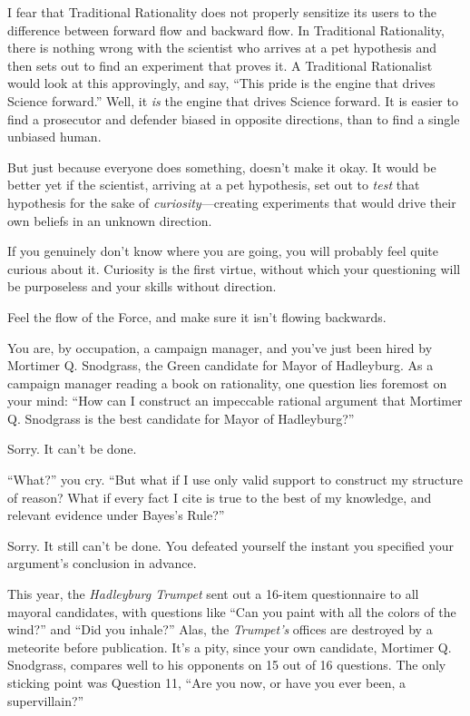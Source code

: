 {
 I fear that Traditional Rationality does not properly sensitize
its users to the difference between forward flow and backward flow. In
Traditional Rationality, there is nothing wrong with the scientist who
arrives at a pet hypothesis and then sets out to find an experiment
that proves it. A Traditional Rationalist would look at this
approvingly, and say, ``This pride is the engine that
drives Science forward.'' Well, it \textit{is} the
engine that drives Science forward. It is easier to find a prosecutor
and defender biased in opposite directions, than to find a single
unbiased human.}

{
 But just because everyone does something, doesn't
make it okay. It would be better yet if the scientist, arriving at a
pet hypothesis, set out to \textit{test} that hypothesis for the sake
of \textit{curiosity}{}---creating experiments that would drive their
own beliefs in an unknown direction.}

{
 If you genuinely don't know where you are going,
you will probably feel quite curious about it. Curiosity is the first
virtue, without which your questioning will be purposeless and your
skills without direction.}

{
 Feel the flow of the Force, and make sure it isn't
flowing backwards.}

\myendsectiontext


{
 You are, by occupation, a campaign manager, and
you've just been hired by Mortimer Q. Snodgrass, the
Green candidate for Mayor of Hadleyburg. As a campaign manager reading
a book on rationality, one question lies foremost on your mind:
``How can I construct an impeccable rational argument
that Mortimer Q. Snodgrass is the best candidate for Mayor of
Hadleyburg?'' }

{
 Sorry. It can't be done.}

{
 ``What?'' you cry.
``But what if I use only valid support to construct my
structure of reason? What if every fact I cite is true to the best of
my knowledge, and relevant evidence under Bayes's
Rule?''}

{
 Sorry. It still can't be done. You defeated
yourself the instant you specified your argument's
conclusion in advance.}

{
 This year, the \textit{Hadleyburg Trumpet} sent out a 16-item
questionnaire to all mayoral candidates, with questions like
``Can you paint with all the colors of the
wind?'' and ``Did you
inhale?'' Alas, the
\textit{Trumpet's} offices are destroyed by a meteorite
before publication. It's a pity, since your own
candidate, Mortimer Q. Snodgrass, compares well to his opponents on 15
out of 16 questions. The only sticking point was Question 11,
``Are you now, or have you ever been, a
supervillain?''}

